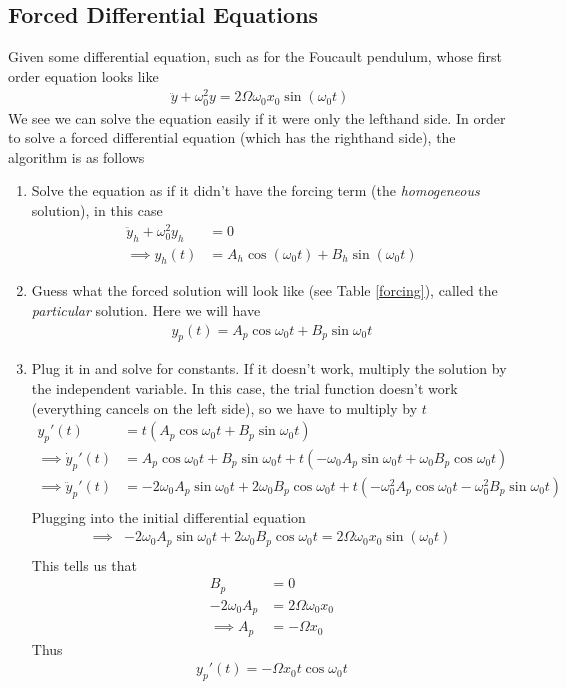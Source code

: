 \subsection{Forced Differential Equations}
Given some differential equation, such as for the Foucault pendulum\cite{taylor}, whose first order equation looks like
\begin{align}
\ddot{y} + \omega_0^2y = 2\Omega\omega_0 x_0\sin(\omega_0 t)
\end{align}
We see we can solve the equation easily if it were only the lefthand side. In order to solve a forced differential equation (which has the righthand side), the algorithm is as follows
\begin{enumerate}
\item Solve the equation as if it didn't have the forcing term (the \emph{homogeneous} solution), in this case
\begin{align}
\ddot{y}_h + \omega_0^2y_h &= 0\\
\implies y_h(t) &= A_h\cos(\omega_0 t) + B_h\sin(\omega_0 t)
\end{align}
\item Guess what the forced solution will look like (see Table \ref{forcing}), called the \emph{particular} solution. Here we will have
\begin{align}
y_p(t) = A_p\cos\omega_0 t + B_p\sin\omega_0 t
\end{align}
\item Plug it in and solve for constants. If it doesn't work, multiply the solution by the independent variable. In this case, the trial function doesn't work (everything cancels on the left side), so we have to multiply by $t$
\begin{align}
y_p'(t) &= t(A_p\cos\omega_0 t + B_p\sin\omega_0 t)\\
\implies \dot{y}_p'(t) &= A_p\cos\omega_0 t + B_p\sin\omega_0 t + t(-\omega_0A_p\sin\omega_0 t + \omega_0B_p\cos\omega_0 t)\\
\implies \ddot{y}_p'(t) &= -2\omega_0A_p\sin\omega_0 t + 2\omega_0B_p\cos\omega_0 t +t(-\omega_0^2 A_p\cos\omega_0t -\omega_0^2B_p\sin\omega_0 t)\\
\end{align}
Plugging into the initial differential equation
\begin{align}
\implies & -2\omega_0A_p\sin\omega_0 t + 2\omega_0B_p\cos\omega_0 t = 2\Omega\omega_0 x_0\sin(\omega_0 t)\\
\end{align}
This tells us that
\begin{align}
B_p &= 0\\
-2\omega_0A_p &= 2\Omega \omega_0x_0\\
\implies A_p &= -\Omega x_0
\end{align}
Thus
\begin{align}
y_p'(t) = -\Omega x_0 t\cos\omega_0 t
\end{align}


\end{enumerate}
